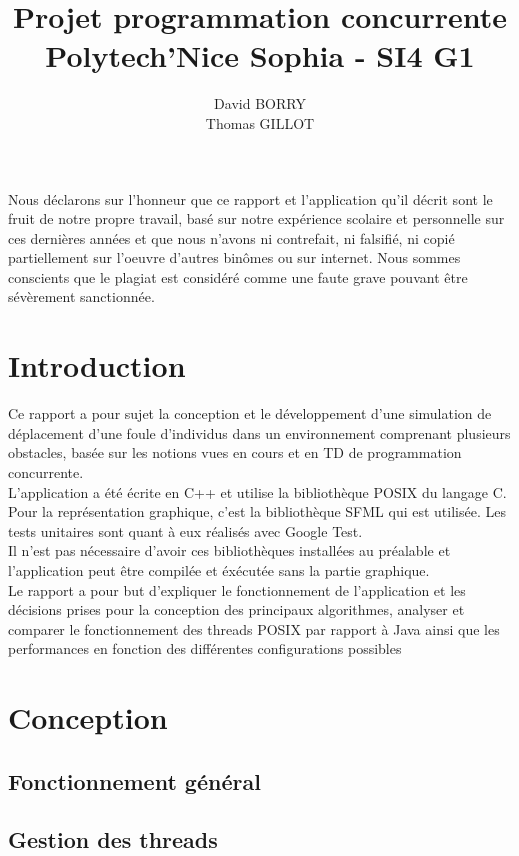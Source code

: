 \documentclass[11pt]{article} %
\title{Projet programmation concurrente \\
	Polytech'Nice Sophia - SI4 G1}
\author{David BORRY\\
		Thomas GILLOT}
\begin{document}
\maketitle

Nous déclarons sur l'honneur que ce rapport et l'application qu'il décrit sont le fruit de notre propre travail, basé sur notre expérience scolaire et personnelle sur ces dernières années et que nous n'avons ni contrefait, ni falsifié, ni copié partiellement sur l'oeuvre d'autres binômes ou sur internet. Nous sommes conscients que le plagiat est considéré comme une faute grave pouvant être sévèrement sanctionnée. 

\newpage

\section{Introduction}
Ce rapport a pour sujet la conception et le développement d'une simulation de déplacement d'une foule d'individus dans un environnement comprenant plusieurs obstacles, basée sur les notions vues en cours et en TD de programmation concurrente.  \\
L'application a été écrite en C++ et utilise la bibliothèque POSIX du langage C.
Pour la représentation graphique, c'est la bibliothèque SFML qui est utilisée.
Les tests unitaires sont quant à eux réalisés avec Google Test. \\
Il n'est pas nécessaire d'avoir ces bibliothèques installées au préalable et l'application peut être compilée et éxécutée sans la partie graphique. \\
Le rapport a pour but d'expliquer le fonctionnement de l'application et les décisions prises pour la conception des principaux algorithmes,  analyser et comparer le fonctionnement des threads POSIX par rapport à Java ainsi que les performances en fonction des différentes configurations possibles



\tableofcontents

\newpage
\section{Conception}
\subsection{Fonctionnement général}
\subsection{Gestion des threads}
\end{document}
